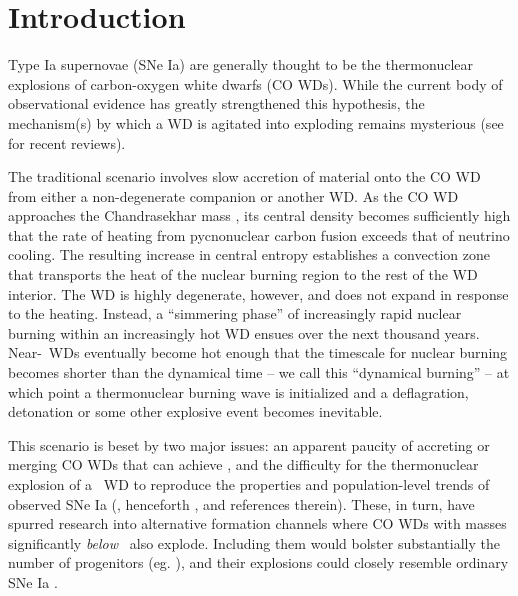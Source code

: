 \section{Introduction}
\label{sec:c5_intro}

Type Ia supernovae (SNe Ia) are generally thought to be the thermonuclear explosions of carbon-oxygen white dwarfs (CO WDs).  While the current body of observational evidence has greatly strengthened this hypothesis, the mechanism(s) by which a WD is agitated into exploding remains mysterious (see \citealt{howe11, hill+13, maozmn14} for recent reviews).  

The traditional scenario involves slow accretion of material onto the CO WD from either a non-degenerate companion or another WD.  As the CO WD approaches the Chandrasekhar mass \Mch, its central density becomes sufficiently high that the rate of heating from pycnonuclear carbon fusion exceeds that of neutrino cooling.  The resulting increase in central entropy establishes a convection zone that transports the heat of the nuclear burning region to the rest of the WD interior.  The WD is highly degenerate, however, and does not expand in response to the heating.  {\charles Instead, a ``simmering phase'' of increasingly rapid nuclear burning within an increasingly hot WD ensues over the next thousand years.  Near-\Mch\ WDs eventually become hot enough that the timescale for nuclear burning becomes shorter than the dynamical time -- we call this ``dynamical burning'' -- at which point a thermonuclear burning wave is initialized and a deflagration, detonation or some other explosive event} becomes inevitable.

This scenario is beset by two major issues: an apparent paucity of accreting or merging CO WDs that can achieve \Mch, and the difficulty for the thermonuclear explosion of a \Mch\ WD to reproduce the properties and population-level trends of observed SNe Ia (\citealt{vkercj10}, henceforth \citeal{vkercj10}, and references therein).  These, in turn, have spurred research into alternative formation channels where CO WDs with masses significantly \textit{below} \Mch\ also explode.  Including them would bolster substantially the number of progenitors (eg. \citealt{badem12}), and their explosions could closely resemble ordinary SNe Ia \citep{shig+92, sim+10}.

